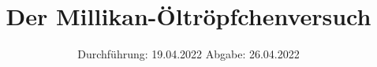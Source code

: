 

\subject{VERSUCH NUMMER 503}
\title{Der Millikan-Öltröpfchenversuch}
\date{%
  Durchführung: 19.04.2022
  \hspace{3em}
  Abgabe: 26.04.2022
}



\maketitle
\thispagestyle{empty}
\tableofcontents
\newpage






\printbibliography{}





